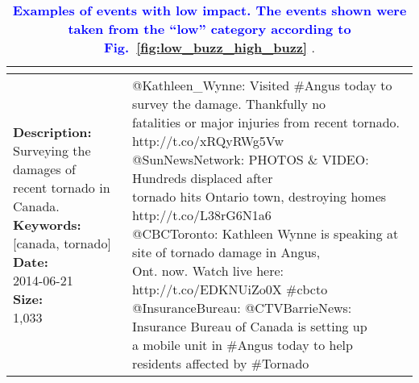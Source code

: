 \begin{table}
{\begin{tabular*}{1\linewidth}{p{5cm}p{5cm}}
{        %
      }
      \\
            \midrule
      \pbox{20cm}{\textbf{Description:}\\Surveying the damages of \\ recent tornado in Canada. \vspace{.1cm}\\
        \textbf{Keywords:}\\ {[}canada, tornado{]}\vspace{.1cm}\\
        \textbf{Date:}\\ 2014-06-21 \vspace{.1cm}\\
        \textbf{Size:}\\ 1,033}
      & \pbox{20cm}{
        @Kathleen\_Wynne: Visited \#Angus today to survey the damage. Thankfully no \\fatalities or major injuries from recent tornado. http://t.co/xRQyRWg5Vw\vspace{.1cm}\\
        @SunNewsNetwork: PHOTOS \& VIDEO: Hundreds displaced after \\ tornado hits Ontario town, destroying homes http://t.co/L38rG6N1a6\vspace{.1cm}\\
        @CBCToronto: Kathleen Wynne is speaking at site of tornado damage in Angus, \\Ont. now. Watch live here: http://t.co/EDKNUiZo0X \#cbcto\vspace{.1cm}\\
        @InsuranceBureau: @CTVBarrieNews: Insurance Bureau of Canada is setting up \\a mobile unit in \#Angus today to help residents affected by \#Tornado}
      \\
      \bottomrule
    \end{tabular*}
  }
  \caption{\textbf{\textcolor{blue}{
                Examples of events with low impact. The events
      shown were taken from the ``low'' category according to Fig.~\ref{fig:low_buzz_high_buzz}}
                }.}
  \label{table:low-impact-sample}
\end{table}
